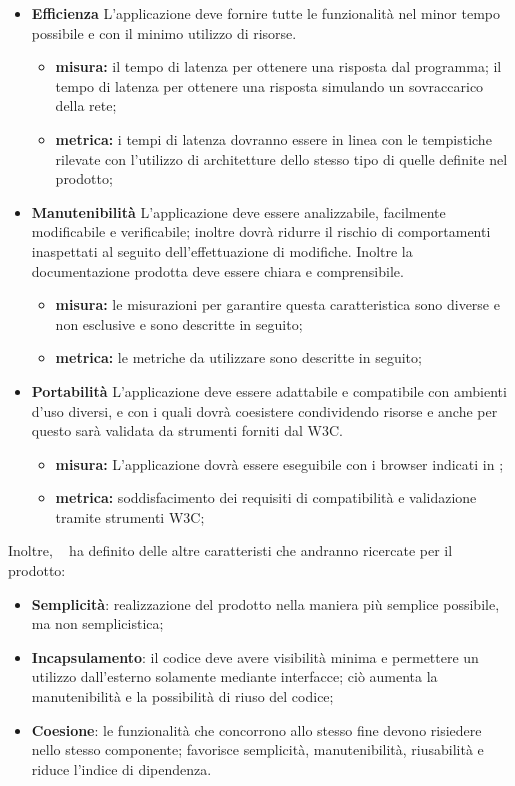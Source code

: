 \begin{itemize}
\item \textbf{Efficienza}
L’applicazione deve fornire tutte le funzionalità nel minor tempo possibile e con il minimo utilizzo di risorse.
\begin{itemize}
\item \textbf{misura:} il tempo di latenza per ottenere una risposta dal programma;
il tempo di latenza per ottenere una risposta simulando un sovraccarico della rete;
\item \textbf{metrica:} i tempi di latenza dovranno essere in linea con le tempistiche rilevate con l'utilizzo di architetture dello stesso tipo di quelle definite nel prodotto;
\end{itemize}

\item \textbf{Manutenibilità}
L’applicazione deve essere analizzabile, facilmente modificabile e verificabile; inoltre dovrà ridurre il rischio di comportamenti inaspettati al seguito dell'effettuazione di modifiche. Inoltre la documentazione prodotta deve essere chiara e comprensibile.
\begin{itemize}
\item \textbf{misura:} le misurazioni per garantire questa caratteristica sono diverse e non esclusive e sono descritte in seguito;
\item \textbf{metrica:} le metriche da utilizzare sono descritte in seguito;
\end{itemize}

\item \textbf{Portabilità}
L’applicazione deve essere adattabile e compatibile con ambienti d’uso diversi, e con i quali dovrà coesistere condividendo risorse e anche per questo sarà validata da strumenti forniti dal W3C.
\begin{itemize}
\item \textbf{misura:} L'applicazione dovrà essere eseguibile con i browser indicati in \infoAR;
\item \textbf{metrica:} soddisfacimento dei requisiti di compatibilità e validazione tramite strumenti W3C;
\end{itemize}
\end{itemize}
Inoltre, \gruppo ~ ha definito delle altre caratteristi che andranno ricercate per il prodotto:
\begin{itemize}

\item \textbf{Semplicità}: realizzazione del prodotto nella maniera più semplice possibile, ma non semplicistica;
\item \textbf{Incapsulamento}: il codice deve avere visibilità minima e permettere un utilizzo dall’esterno solamente mediante interfacce; ciò aumenta la manutenibilità e la possibilità di riuso del codice;
\item \textbf{Coesione}: le funzionalità che concorrono allo stesso fine devono risiedere nello stesso componente; favorisce semplicità, manutenibilità, riusabilità e riduce l’indice di dipendenza.
\end{itemize}

